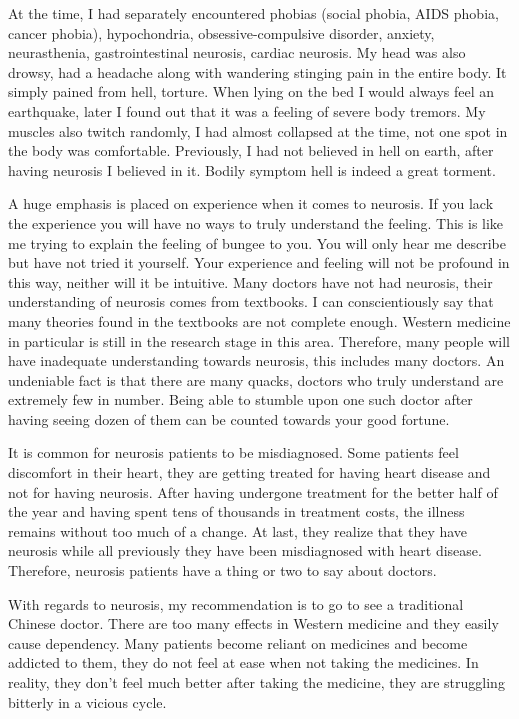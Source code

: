\documentclass[
]{book}
\begin{document}
At the time, I had separately encountered phobias (social phobia, AIDS phobia, cancer phobia), hypochondria, obsessive-compulsive disorder, anxiety, neurasthenia, gastrointestinal neurosis, cardiac neurosis. My head was also drowsy, had a headache along with wandering stinging pain in the entire body. It simply pained from hell, torture. When lying on the bed I would always feel an earthquake, later I found out that it was a feeling of severe body tremors. My muscles also twitch randomly, I had almost collapsed at the time, not one spot in the body was comfortable. Previously, I had not believed in hell on earth, after having neurosis I believed in it. Bodily symptom hell is indeed a great torment.

A huge emphasis is placed on experience when it comes to neurosis. If you lack the experience you will have no ways to truly understand the feeling. This is like me trying to explain the feeling of bungee to you. You will only hear me describe but have not tried it yourself. Your experience and feeling will not be profound in this way, neither will it be intuitive. Many doctors have not had neurosis, their understanding of neurosis comes from textbooks. I can conscientiously say that many theories found in the textbooks are not complete enough. Western medicine in particular is still in the research stage in this area. Therefore, many people will have inadequate understanding towards neurosis, this includes many doctors. An undeniable fact is that there are many quacks, doctors who truly understand are extremely few in number. Being able to stumble upon one such doctor after having seeing dozen of them can be counted towards your good fortune.

It is common for neurosis patients to be misdiagnosed. Some patients feel discomfort in their heart, they are getting treated for having heart disease and not for having neurosis. After having undergone treatment for the better half of the year and having spent tens of thousands in treatment costs, the illness remains without too much of a change. At last, they realize that they have neurosis while all previously they have been misdiagnosed with heart disease. Therefore, neurosis patients have a thing or two to say about doctors.

With regards to neurosis, my recommendation is to go to see a traditional Chinese doctor. There are too many effects in Western medicine and they easily cause dependency. Many patients become reliant on medicines and become addicted to them, they do not feel at ease when not taking the medicines. In reality, they don't feel much better after taking the medicine, they are struggling bitterly in a vicious cycle.
\end{document}
